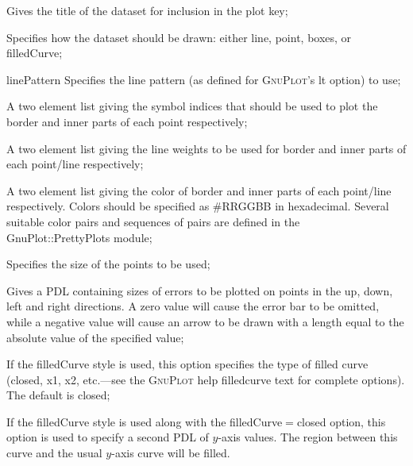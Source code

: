 \begin{description}
\item[{\normalfont \ttfamily title}] Gives the title of the dataset for inclusion in the plot key;
\item[{\normalfont \ttfamily style}] Specifies how the dataset should be drawn: either {\normalfont \ttfamily line}, {\normalfont \ttfamily point}, {\normalfont \ttfamily boxes}, or {\normalfont \ttfamily filledCurve};
\item{{\normalfont \ttfamily linePattern}} Specifies the line pattern (as defined for {\normalfont \scshape GnuPlot}'s {\normalfont \ttfamily lt} option) to use;
\item[{\normalfont \ttfamily symbol}] A two element list giving the symbol indices that should be used to plot the border and inner parts of each point respectively;
\item[{\normalfont \ttfamily weight}] A two element list giving the line weights to be used for border and inner parts of each point/line respectively;
\item[{\normalfont \ttfamily color}] A two element list giving the color of border and inner parts of each point/line respectively. Colors should be specified as {\normalfont \ttfamily \#RRGGBB} in hexadecimal. Several suitable color pairs and sequences of pairs are defined in the {\normalfont \ttfamily GnuPlot::PrettyPlots} module;
\item[{\normalfont \ttfamily pointSize}] Specifies the size of the points to be used;
\item[{\normalfont \ttfamily errorNNN}] Gives a PDL containing sizes of errors to be plotted on points in the up, down, left and right directions. A zero value will cause the error bar to be omitted, while a negative value will cause an arrow to be drawn with a length equal to the absolute value of the specified value;
\item[{\normalfont \ttfamily filledCurve}] If the {\normalfont \ttfamily filledCurve} style is used, this option specifies the type of filled curve ({\normalfont \ttfamily closed}, {\normalfont \ttfamily x1}, {\normalfont \ttfamily x2}, etc.---see the {\normalfont \scshape GnuPlot} {\normalfont \ttfamily help filledcurve} text for complete options). The default is {\normalfont \ttfamily closed};
\item[{\normalfont \ttfamily y2}] If the {\normalfont \ttfamily filledCurve} style is used along with the {\normalfont \ttfamily filledCurve}$=${\normalfont \ttfamily closed} option, this option is used to specify a second PDL of $y$-axis values. The region between this curve and the usual $y$-axis curve will be filled.
\end{description}
